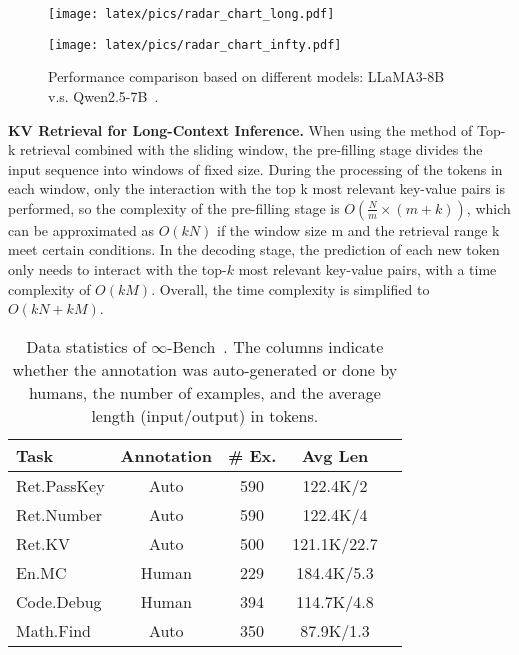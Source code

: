 \begin{figure*}[!ht] 
    \centering
    \begin{minipage}{0.45\textwidth}
        \centering
        \texttt{[image: latex/pics/radar\_chart\_long.pdf]}
        \label{fig:radar_long}
    \end{minipage}
    \hfill
    \begin{minipage}{0.45\textwidth}
        \centering
        \texttt{[image: latex/pics/radar\_chart\_infty.pdf]}
        \label{fig:radar_infty}
    \end{minipage}
    \caption{Performance comparison based on different models: LLaMA3-8B~\cite{llama3} v.s. Qwen2.5-7B~\cite{qwen2.5}.}
    \label{fig:models}
\end{figure*}
\textbf{KV Retrieval for Long-Context Inference.}
When using the method of Top-k retrieval combined with the sliding window, the pre-filling stage divides the input sequence into windows of fixed size. During the processing of the tokens in each window, only the interaction with the top k most relevant key-value pairs is performed, so the complexity of the pre-filling stage is $O(\frac{N}{m}\times(m+k))$, which can be approximated as $O(kN)$ if the window size m and the retrieval range k meet certain conditions. In the decoding stage, the prediction of each new token only needs to interact with the top-$k$ most relevant key-value pairs, with a time complexity of $O(kM)$. Overall, the time complexity is simplified to $O(kN+kM)$.



\begin{table}[!ht]
    \footnotesize
    \centering
    \begin{tabular}{l|cccc}
        \toprule
        \textbf{Task}  & \textbf{Annotation}  & \textbf{\# Ex.} & \textbf{Avg Len} \\
        \midrule
        Ret.PassKey    & Auto & 590 & 122.4K/2\\
        Ret.Number     & Auto & 590 & 122.4K/4\\
        Ret.KV         & Auto & 500 & 121.1K/22.7\\
   
        En.MC       & Human & 229 & 184.4K/5.3\\

        Code.Debug  & Human & 394 & 114.7K/4.8\\

        Math.Find   & Auto & 350 & 87.9K/1.3 \\
        \bottomrule
    \end{tabular}
    \caption{Data statistics of $\infty$-Bench~\cite{infinitebench}. The columns indicate whether the annotation was auto-generated or done by humans, the number of examples, and the average length (input/output) in tokens.}
    \label{tab:dataset-infty}
\end{table}

